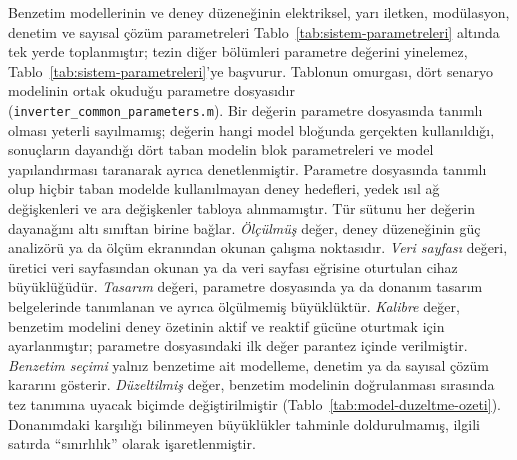 Benzetim modellerinin ve deney düzeneğinin elektriksel, yarı iletken, modülasyon, denetim ve sayısal çözüm parametreleri Tablo~\ref{tab:sistem-parametreleri} altında tek yerde toplanmıştır; tezin diğer bölümleri parametre değerini yinelemez, Tablo~\ref{tab:sistem-parametreleri}'ye başvurur. Tablonun omurgası, dört senaryo modelinin ortak okuduğu parametre dosyasıdır (\texttt{inverter\_common\_parameters.m}). Bir değerin parametre dosyasında tanımlı olması yeterli sayılmamış; değerin hangi model bloğunda gerçekten kullanıldığı, sonuçların dayandığı dört taban modelin blok parametreleri ve model yapılandırması taranarak ayrıca denetlenmiştir. Parametre dosyasında tanımlı olup hiçbir taban modelde kullanılmayan deney hedefleri, yedek ısıl ağ değişkenleri ve ara değişkenler tabloya alınmamıştır. Tür sütunu her değerin dayanağını altı sınıftan birine bağlar. \emph{Ölçülmüş} değer, deney düzeneğinin güç analizörü ya da ölçüm ekranından okunan çalışma noktasıdır. \emph{Veri sayfası} değeri, üretici veri sayfasından okunan ya da veri sayfası eğrisine oturtulan cihaz büyüklüğüdür. \emph{Tasarım} değeri, parametre dosyasında ya da donanım tasarım belgelerinde tanımlanan ve ayrıca ölçülmemiş büyüklüktür. \emph{Kalibre} değer, benzetim modelini deney özetinin aktif ve reaktif gücüne oturtmak için ayarlanmıştır; parametre dosyasındaki ilk değer parantez içinde verilmiştir. \emph{Benzetim seçimi} yalnız benzetime ait modelleme, denetim ya da sayısal çözüm kararını gösterir. \emph{Düzeltilmiş} değer, benzetim modelinin doğrulanması sırasında tez tanımına uyacak biçimde değiştirilmiştir (Tablo~\ref{tab:model-duzeltme-ozeti}). Donanımdaki karşılığı bilinmeyen büyüklükler tahminle doldurulmamış, ilgili satırda ``sınırlılık'' olarak işaretlenmiştir.

